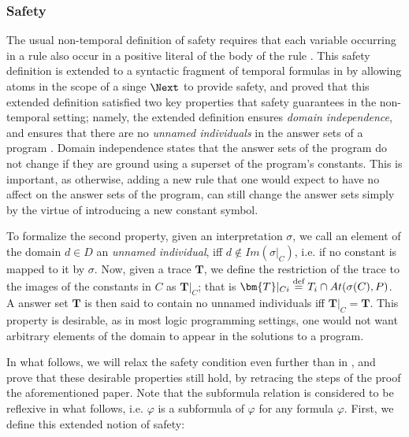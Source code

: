 \subsubsection{Safety}

The usual non-temporal definition of safety requires that each
variable occurring in a rule also occur in a positive literal of the
body of the rule \cite{gekakasc12a}. This safety definition is
extended to a syntactic fragment of temporal formulas in
\cite{agcapevidi17a} by allowing atoms in the scope of a singe $\Next$
to provide safety, and proved that this extended definition satisfied
two key properties that safety guarantees in the non-temporal setting;
namely, the extended definition ensures \emph{domain independence},
and ensures that there are no \emph{unnamed individuals} in the answer
sets of a program \cite{capeva09a} \cite{capeva09b}. Domain
independence states that the answer sets of the program do not change
if they are ground using a superset of the program's constants. This
is important, as otherwise, adding a new rule that one would expect to
have no affect on the answer sets of the program, can still change the
answer sets simply by the virtue of introducing a new constant symbol.

To formalize the second property, given an interpretation $\sigma$, we
call an element of the domain $d \in D$ an \emph{unnamed individual},
iff $d \not\in Im(\sigma\vert_{C})$, i.e. if no constant is mapped to
it by $\sigma$. Now, given a trace $\bm{T}$, we define the restriction
of the trace to the images of the constants in $C$ as
$\bm{T}\vert _C$; that is
$\bm{T}\vert_{Ci} \defeq T_i \cap At(\sigma(C),P)$. A answer set $\bm{T}$
is then said to contain no unnamed individuals iff
$\bm{T} \vert_{C} = \bm{T}$. This property is desirable, as in most
logic programming settings, one would not want arbitrary elements of
the domain to appear in the solutions to a program.

In what follows, we will relax the safety condition even further than
in \cite{agcapevidi17a}, and prove that these desirable properties
still hold, by retracing the steps of the proof the aforementioned
paper. Note that the subformula relation is considered to be reflexive
in what follows, i.e. $\varphi$ is a subformula of $\varphi$ for any
formula $\varphi$. First, we define this extended notion of safety:

